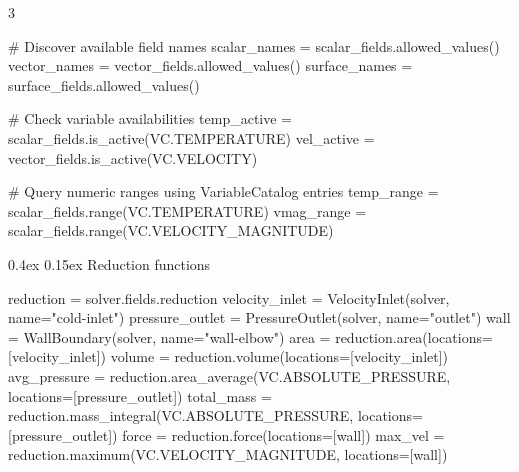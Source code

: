 \documentclass[
  9pt,
  landscape]{article}
\makeatletter
\newenvironment{Shaded}{\begin{snugshade}}{\end{snugshade}}
\newcommand{\BuiltInTok}[1]{\textcolor[rgb]{0.00,0.23,0.31}{#1}}
\newcommand{\CommentTok}[1]{\textcolor[rgb]{0.37,0.37,0.37}{#1}}
\newcommand{\NormalTok}[1]{\textcolor[rgb]{0.00,0.23,0.31}{#1}}
\newcommand{\OperatorTok}[1]{\textcolor[rgb]{0.37,0.37,0.37}{#1}}
\newcommand{\StringTok}[1]{\textcolor[rgb]{0.13,0.47,0.30}{#1}}
\renewcommand{\subsection}{\@startsection{subsection}{2}{0mm}%
    {0.4ex}%
    {0.15ex}%
  {\normalfont\small\bfseries\color{black}}}
\renewenvironment{Shaded}{\begin{snugshade}}{\end{snugshade}}
\makeatother
\begin{document}
\begin{multicols}{3}
\begin{Shaded}
\begin{Highlighting}[]
\CommentTok{\# Discover available field names }
\NormalTok{scalar\_names }\OperatorTok{=}\NormalTok{ scalar\_fields.allowed\_values()}
\NormalTok{vector\_names }\OperatorTok{=}\NormalTok{ vector\_fields.allowed\_values()}
\NormalTok{surface\_names }\OperatorTok{=}\NormalTok{ surface\_fields.allowed\_values()}

\CommentTok{\# Check variable availabilities}
\NormalTok{temp\_active }\OperatorTok{=}\NormalTok{ scalar\_fields.is\_active(VC.TEMPERATURE)}
\NormalTok{vel\_active }\OperatorTok{=}\NormalTok{ vector\_fields.is\_active(VC.VELOCITY)}

\CommentTok{\# Query numeric ranges using VariableCatalog entries}
\NormalTok{temp\_range }\OperatorTok{=}\NormalTok{ scalar\_fields.}\BuiltInTok{range}\NormalTok{(VC.TEMPERATURE)}
\NormalTok{vmag\_range }\OperatorTok{=}\NormalTok{ scalar\_fields.}\BuiltInTok{range}\NormalTok{(VC.VELOCITY\_MAGNITUDE)}
\end{Highlighting}
\end{Shaded}

\subsection{Reduction functions}\label{reduction-functions}

\begin{Shaded}
\begin{Highlighting}[]
\NormalTok{reduction }\OperatorTok{=}\NormalTok{ solver.fields.reduction}
\NormalTok{velocity\_inlet }\OperatorTok{=}\NormalTok{ VelocityInlet(solver, name}\OperatorTok{=}\StringTok{"cold{-}inlet"}\NormalTok{)}
\NormalTok{pressure\_outlet }\OperatorTok{=}\NormalTok{ PressureOutlet(solver, name}\OperatorTok{=}\StringTok{"outlet"}\NormalTok{)}
\NormalTok{wall }\OperatorTok{=}\NormalTok{ WallBoundary(solver, name}\OperatorTok{=}\StringTok{"wall{-}elbow"}\NormalTok{)}
\NormalTok{area }\OperatorTok{=}\NormalTok{ reduction.area(locations}\OperatorTok{=}\NormalTok{[velocity\_inlet])}
\NormalTok{volume }\OperatorTok{=}\NormalTok{ reduction.volume(locations}\OperatorTok{=}\NormalTok{[velocity\_inlet])}
\NormalTok{avg\_pressure }\OperatorTok{=}\NormalTok{ reduction.area\_average(VC.ABSOLUTE\_PRESSURE, locations}\OperatorTok{=}\NormalTok{[pressure\_outlet])}
\NormalTok{total\_mass }\OperatorTok{=}\NormalTok{ reduction.mass\_integral(VC.ABSOLUTE\_PRESSURE, locations}\OperatorTok{=}\NormalTok{[pressure\_outlet])}
\NormalTok{force }\OperatorTok{=}\NormalTok{ reduction.force(locations}\OperatorTok{=}\NormalTok{[wall])}
\NormalTok{max\_vel }\OperatorTok{=}\NormalTok{ reduction.maximum(VC.VELOCITY\_MAGNITUDE, locations}\OperatorTok{=}\NormalTok{[wall])}
\end{Highlighting}
\end{Shaded}


\end{multicols}
\end{document}
